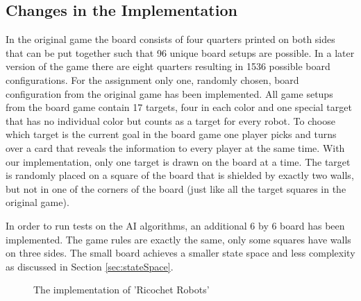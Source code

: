 \documentclass[a4paper,10pt]{article}
\begin{document}
  \subsection{Changes in the Implementation}
  In the original game the board consists of four quarters printed on both sides that can be put together such that 96 unique board setups are possible. In a later version of the
  game there are eight quarters resulting in 1536 possible board configurations. For the assignment only one, randomly chosen, board configuration from the original game has been
  implemented. All game setups from the board game contain 17 targets, four in each color and one special target that has no individual color but counts as a target for every
  robot. To choose which target is the current goal in the board game one player picks and turns over a card that reveals the information to every player at the same time. With
  our implementation, only one target is drawn on the board at a time. The target is randomly placed on a square of the board that is shielded by exactly two walls, but not in one of the corners of the board (just like all the target squares in the original game).
  \par
  In order to run tests on the AI algorithms, an additional 6 by 6 board has been implemented. The game rules are exactly the same, only some squares have walls on three sides.
  The small board achieves a smaller state space and less complexity as discussed in Section \ref{sec:stateSpace}.
  \begin{figure}[!htb]
  \caption{The implementation of 'Ricochet Robots'}
  \label{fig:implementation}
  \end{figure}
\end{document}
